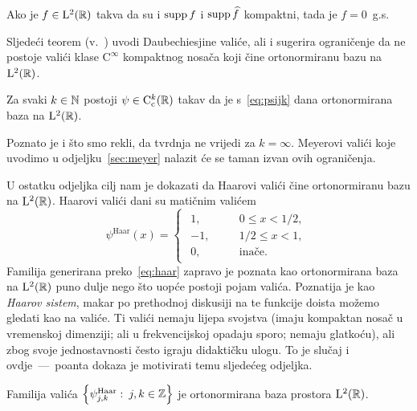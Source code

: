 \documentclass[main.tex]{subfiles}
\newcommand{\mr}[1]{\mathrm{#1}}
\begin{document}
\begin{teorem}
	Ako je \( f \in \mathrm{L}^2(\mathbb{R}) \) takva da su i \( \operatorname{supp} f \)
	i \( \operatorname{supp} \widehat{f} \) kompaktni, tada je \( f=0 \)~g.s.
\end{teorem}
Sljedeći teorem (v.~\cite{daub2}) uvodi Daubechiesjine valiće, ali i sugerira ograničenje
da ne postoje valići klase \( \mr C^\infty \) kompaktnog nosača
koji čine ortonormiranu bazu na \( \mathrm{L}^2(\mathbb{R}) \).
\begin{teorem}
	Za svaki \( k \in \mathbb{N} \) postoji \( \psi \in \mr C_\mrc ^k(\R) \)
	takav da je s~\eqref{eq:psijk} dana
	ortonormirana baza na \( \mathrm{L}^2(\mathbb{R}) \).
\end{teorem}
Poznato je i što smo rekli, da tvrdnja ne vrijedi za \( k = \infty \).
Meyerovi valići koje uvodimo u odjeljku~\ref{sec:meyer}
nalazit će se taman izvan ovih ograničenja.

\bigskip
\newcommand{\psh}{\psi^{\mathrm{Haar}}}
U ostatku odjeljka cilj nam je dokazati da Haarovi valići čine ortonormiranu bazu
na \( \mathrm{L}^2(\mathbb{R}) \). Haarovi valići dani su matičnim valićem
\begin{equation}\label{eq:haar}
	\psi^{\mathrm{Haar}}(x) = \begin{cases}\begin{aligned}
			1,  & \quad & 0 \le x < 1/2, \\
			-1, & \quad & 1/2 \le x < 1, \\
			0,  & \quad & \text{inače}.
		\end{aligned}\end{cases}
\end{equation}
Familija generirana preko~\eqref{eq:haar} zapravo je poznata
kao ortonormirana baza na \( \mathrm{L}^2(\mathbb{R}) \) puno dulje nego što uopće postoji pojam valića.
Poznatija je kao \emph{Haarov sistem}, makar po prethodnoj diskusiji na te funkcije
doista možemo gledati kao na valiće. Ti valići nemaju lijepa svojstva (imaju
kompaktan nosač u vremenskoj dimenziji; ali u frekvencijskoj opadaju sporo;
nemaju glatkoću), ali zbog svoje jednostavnosti često igraju didaktičku ulogu.
To je slučaj i ovdje~---~poanta dokaza je motivirati temu sljedećeg odjeljka.

\begin{teorem}
	Familija valića \( \left\{ \psh_{j,k} \st j,k \in \Z \right\} \)
	je ortonormirana baza prostora \( \mathrm{L}^2(\mathbb{R}) \).
\end{teorem}
\end{document}
